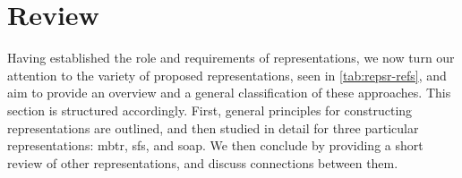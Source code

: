 
\chapter{Review}
\label{ch:repsr}



Having established the role and requirements of representations, we now turn our attention to the variety of proposed representations, seen in \cref{tab:repsr-refs}, and aim to provide an overview and a general classification of these approaches. This section is structured accordingly. 
First, general principles for constructing representations are outlined, and then studied in detail for three particular representations: \gls{mbtr}, \glspl{sf}, and \gls{soap}. We then conclude by providing a short review of other representations, and discuss connections between them.


